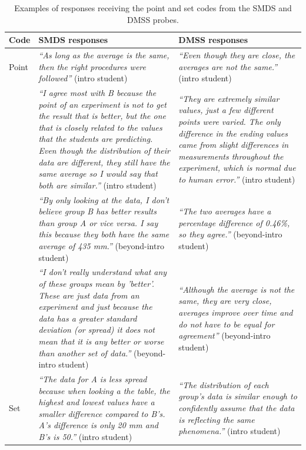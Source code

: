 \documentclass[english,aps,prstper,reprint,showpacs,longbibliography,superscriptaddress,nofootinbib]{revtex4-2}
\begin{document}
\begin{table}[tb] 
  \caption{Examples of responses receiving the point and set codes from the SMDS and DMSS probes.}
  \label{ta:pmq}
  \begin{ruledtabular}
    \begin{tabular}{p{}p{}p{}}
    \textbf{Code} & \textbf{SMDS responses}& \textbf{DMSS responses}\\
      \hline
    Point & \textit{``As long as the average is the same, then the right procedures were followed''} (intro student) & \textit{``Even though they are close, the averages are not the same.''} (intro student)\\
    & \textit{``I agree most with B because the point of an experiment is not to get the result that is better, but the one that is closely related to the values that the students are predicting. Even though the distribution of their data are different, they still have the same average so I would say that both are similar.''} (intro student) & \textit{``They are extremely similar values, just a few different points were varied. The only difference in the ending values came from slight differences in measurements throughout the experiment, which is normal due to human error.''} (intro student)\\
    & \textit{``By only looking at the data, I don't believe group B has better results than group A or vice versa. I say this because they both have the same average of 435 mm.''} (beyond-intro student) & \textit{``The two averages have a percentage difference of 0.46\%, so they agree.''} (beyond-intro student)\\
    & \textit{``I don't really understand what any of these groups mean by 'better'. These are just data from an experiment and just because the data has a greater standard deviation (or spread) it does not mean that it is any better or worse than another set of data.''} (beyond-intro student) & \textit{``Although the average is not the same, they are very close, averages improve over time and do not have to be equal for agreement''} (beyond-intro student)\\
    \hline
    Set & \textit{``The data for A is less spread because when looking a the table, the highest and lowest values have a smaller difference compared to B's. A's difference is only 20 mm and B's is 50.''} (intro student) & \textit{``The distribution of each group's data is similar enough to confidently assume that the data is reflecting the same phenomena.''} (intro student) \\

\end{tabular}
\end{ruledtabular}
\end{table}
\end{document}

